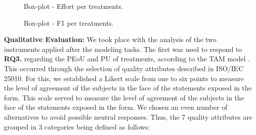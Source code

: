 \begin{figure}[!htb]
        \centering
        
        \caption{Box-plot - Effort per treatments.}
        \label{fig:boxplotTempo}
\end{figure}


\begin{figure}[!htb]
        \centering
        
        \caption{Box-plot - F1 per treatments.}
        \label{fig:BoxPlotMedidaF}
\end{figure}

%     

\textbf{Qualitative Evaluation:} We took place with the analysis of the two instruments applied after the modeling tasks.
The first was used to respond to \textbf{RQ3.} regarding the PEoU and PU of treatments, according to the TAM model \cite{Davis:1989,Persico:2014}. 
This occurred through the selection of quality attributes described in ISO/IEC 25010.
For this, we established a Likert scale from one to six points to measure the level of agreement of the subjects in the face of the statements exposed in the form.
This scale served to measure the level of agreement of the subjects in the face of the statements exposed in the form.
We chosen an even number of alternatives to avoid possible neutral responses.
Thus, the 7 quality attributes are grouped in 3 categories being defined as follows:

